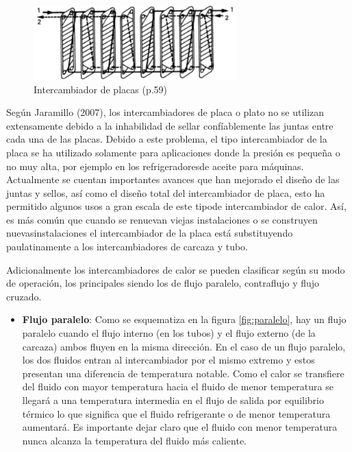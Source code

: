 \documentclass[12pt,letterpaper]{article}     %
\begin{document}
\begin{figure}[H]
\centering
\includegraphics[width=0.7\textwidth]{placas.PNG}
\caption{Intercambiador de placas \cite{Lopez} (p.59)}
\label{fig:plato}
\end{figure}

Según Jaramillo (2007), los intercambiadores de placa o plato no se utilizan extensamente debido a la inhabilidad de sellar confíablemente las juntas entre cada una de las placas. Debido a este problema, el tipo intercambiador de la placa se ha utilizado solamente para aplicaciones donde la presión es pequeña o no muy alta, por ejemplo en los refrigeradoresde aceite para máquinas. Actualmente se cuentan importantes avances que han mejorado el diseño de las juntas y sellos, así como el diseño total del intercambiador de placa, esto ha permitido algunos usos a gran escala de este tipode intercambiador de calor. Así, es más común que cuando se renuevan viejas instalaciones o se construyen nuevasinstalaciones el intercambiador de la placa está substituyendo paulatinamente a los intercambiadores de carcaza y tubo.

Adicionalmente los intercambiadores de calor se pueden clasificar según su modo de operación, los principales siendo los de flujo paralelo, contraflujo y flujo cruzado.

\begin{itemize}
\item \textbf{Flujo paralelo}: Como se esquematiza en la figura \ref{fig:paralelo}, hay un flujo paralelo cuando el flujo interno (en los tubos) y el flujo externo (de la carcaza) ambos fluyen en la misma dirección. En el caso de un flujo paralelo, los dos fluidos entran al intercambiador por el mismo extremo y estos presentan una diferencia de temperatura notable. Como el calor se transfiere del fluido con mayor temperatura hacia el fluido de menor temperatura se llegará a una temperatura intermedia en el flujo de salida por equilibrio térmico lo que significa que el fluido refrigerante o de menor temperatura aumentará. Es importante dejar claro que el fluido con menor temperatura nunca alcanza la temperatura del fluido más caliente.
\end{itemize}
\end{document}
